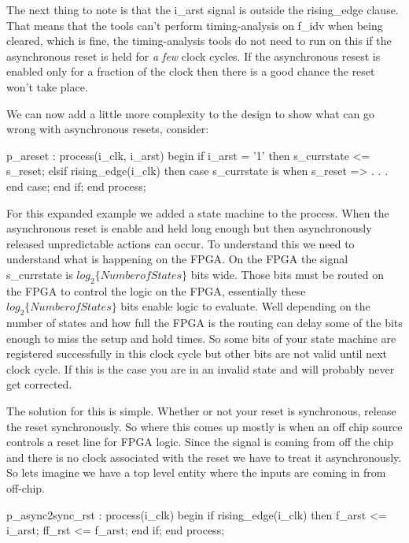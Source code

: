 The next thing to note is that the i\_arst signal is outside the rising\_edge clause. That means that the tools can't perform timing-analysis on f\_idv when being cleared, which is fine, the timing-analysis tools do not need to run on this if the asynchronous reset is held for \emph{a few} clock cycles. If the asynchronous resest is enabled only for a fraction of the clock then there is a good chance the reset won't take place. 

We can now add a little more complexity to the design to show what can go wrong with asynchronous resets, consider:

\begin{VHDLlisting}[tabsize=4]
p_areset : process(i_clk, i_arst)
begin
	if i_arst = '1' then
		s_currstate <= s_reset;
	elsif rising_edge(i_clk) then
		case s_currstate is
			when s_reset => 
			.
			.
			.
		end case;
	end if;
end process;
\end{VHDLlisting}

For this expanded example we added a state machine to the process. When the asynchronous reset is enable and held long enough but then asynchronously released unpredictable actions can occur. To understand this we need to understand what is happening on the \ac{FPGA}. On the \ac{FPGA} the signal s\_currstate is $log_2\{Number of States\}$ bits wide. Those bits must be routed on the \ac{FPGA} to control the logic on the \ac{FPGA}, essentially these $log_2\{Number of States\}$ bits enable logic to evaluate. Well depending on the number of states and how full the \ac{FPGA} is the routing can delay some of the bits enough to miss the setup and hold times. So some bits of your state machine are registered successfully in this clock cycle but other bits are not valid until next clock cycle. If this is the case you are in an invalid state and will probably never get corrected. 

The solution for this is simple. Whether or not your reset is synchronous, release the reset synchronously. So where this comes up mostly is when an off chip source controls a reset line for \ac{FPGA} logic. Since the signal is coming from off the chip and there is no clock associated with the reset we have to treat it asynchronously. So lets imagine we have a top level entity where the inputs are coming in from off-chip. 

\begin{VHDLlisting}[tabsize=4]
p_async2sync_rst : process(i_clk)
begin
	if rising_edge(i_clk) then
		f_arst <= i_arst;
		ff_rst <= f_arst;
	end if;
end process;
\end{VHDLlisting}
		
